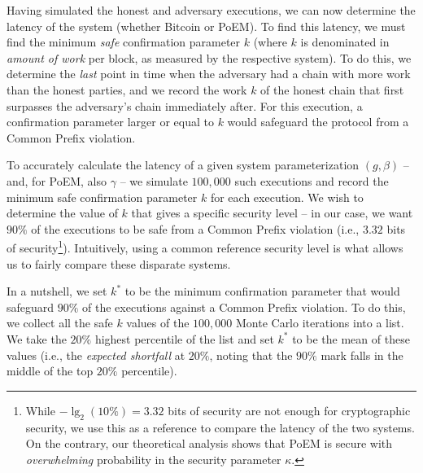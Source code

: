 Having simulated the honest and adversary executions, we can now determine the latency of the system (whether Bitcoin or PoEM).
To find this latency, we must find the minimum \emph{safe} confirmation parameter $k$ (where $k$ is denominated in \emph{amount of work} per block, as measured
by the respective system).
To do this, we determine the \emph{last} point in time when the adversary had a chain with more work than the honest parties,
and we record the work $k$ of the honest chain that first surpasses the adversary's chain immediately after.
For this execution, a confirmation parameter larger or equal to $k$ would safeguard the protocol from a Common Prefix violation.

To accurately calculate the latency of a given system parameterization $(g, \beta)$ -- and, for PoEM, also $\gamma$ -- we
simulate $100{,}000$ such executions and record the minimum safe confirmation
parameter $k$ for each execution. We wish to determine the value of $k$ that gives a specific
security level -- in our case, we want $90\%$ of the executions to be safe from a Common Prefix violation (i.e., $3.32$ bits of
security\footnote{While $-\lg_2(10\%) = 3.32$ bits of security are not enough for cryptographic security, we use this as a
reference to compare the latency of the two systems. On the contrary, our theoretical analysis shows that PoEM is secure with \emph{overwhelming} probability
in the security parameter $\kappa$.}).
Intuitively, using a common reference security level is what allows us to fairly compare these disparate systems.

In a nutshell, we set $k^*$ to be the minimum confirmation parameter that would safeguard $90\%$ of the executions against a Common Prefix violation.
To do this, we collect all the safe $k$ values of the $100{,}000$ Monte Carlo iterations into a list.
We take the $20\%$ highest percentile of the list and set $k^*$ to be the mean of these values (i.e., the \emph{expected shortfall}
at $20\%$, noting that the $90\%$ mark falls in the middle of the top $20\%$ percentile).


